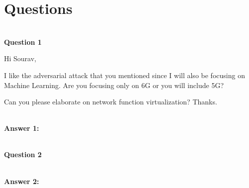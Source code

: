 \documentclass[journal]{IEEEtran}
\begin{document}
\section{Questions}
\\
\textbf{Question 1}

Hi Sourav,

I like the adversarial attack that you mentioned since I will also be focusing on Machine Learning. Are you focusing only on 6G or you will include 5G?


Can you please elaborate on network function virtualization? Thanks.

\\
\textbf{Answer 1:}


\\
\textbf{Question 2}


\\
\textbf{Answer 2:}
\end{document}
